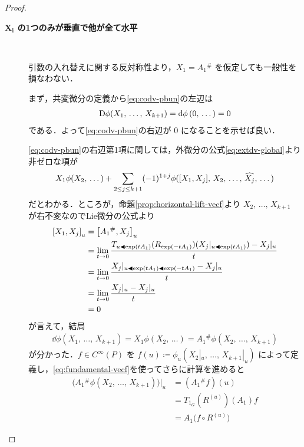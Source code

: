 \documentclass[TQFT_main]{subfiles}
\begin{document}
\begin{proof}
\begin{description}
        \item[\textbf{$\bm{X_i}$ の1つのみが垂直で他が全て水平}]　
        
        引数の入れ替えに関する反対称性より，$X_1 = A_1{}^\#$ を仮定しても一般性を損なわない．

        まず，共変微分の定義から\eqref{eq:codv-pbun}の左辺は
        \begin{align}
            \mathrm{D}\phi(X_1,\, \dots,\, X_{k+1}) = \dd{\phi}(0,\, \dots) = 0
        \end{align}
        である．よって\eqref{eq:codv-pbun}の右辺が $0$ になることを示せば良い．
        
        \eqref{eq:codv-pbun}の右辺第1項に関しては，外微分の公式\eqref{eq:extdv-global}より非ゼロな項が
        \begin{align}
            X_1 \phi(X_2,\, \dots) + \sum_{2 \le j \le k+1} (-1)^{1+j} \phi(\comm{X_1}{X_j},\, X_2,\, \dots,\, \widehat{X_j},\, \dots)
        \end{align}
        だとわかる．ところが，命題\ref{prop:horizontal-lift-vecf}より $X_2,\, \dots,\, X_{k+1}$ が右不変なのでLie微分の公式より
        \begin{align}
            \comm{X_1}{X_j}_u
            &= \comm{A_1{}^\#}{X_j}_u \\
            &= \lim_{t\to 0} \frac{T_{u \btl \exp(tA_1)} (R_{\exp (-tA_1)}) (X_j|_{u \btl \exp(tA_1)}) - X_j|_u}{t} \\
            &= \lim_{t\to 0} \frac{X_j|_{u \btl \exp(tA_1) \btl\exp (-tA_1)} - X_j|_u}{t} \\
            &= \lim_{t\to 0} \frac{X_j|_u - X_j|_u}{t} \\
            &= 0
        \end{align}
        が言えて，結局
        \begin{align}
            \dd{\phi}(X_1,\, \dots,\, X_{k+1}) = X_1 \phi(X_2,\, \dots) = A_1{}^\# \phi(X_2,\, \dots,\, X_{k+1})
        \end{align}
        が分かった．$f \in C^\infty (P)$ を $f(u) \coloneqq \phi_u(X_2|_u,\, \dots,\, X_{k+1}|_u)$ によって定義し，\eqref{eq:fundamental-vecf}を使ってさらに計算を進めると
        \begin{align}
            \bigl(A_1{}^\# \phi(X_2,\, \dots,\, X_{k+1})\bigr)|_u
            &= (A_1{}^\# f)(u) \\
            &= T_{1_G} (R^{(u)})(A_1) f \\
            &= A_1 \bigl( f \circ R^{(u)} \bigr)
        \end{align}

\end{description}
\end{proof}
\end{document}
